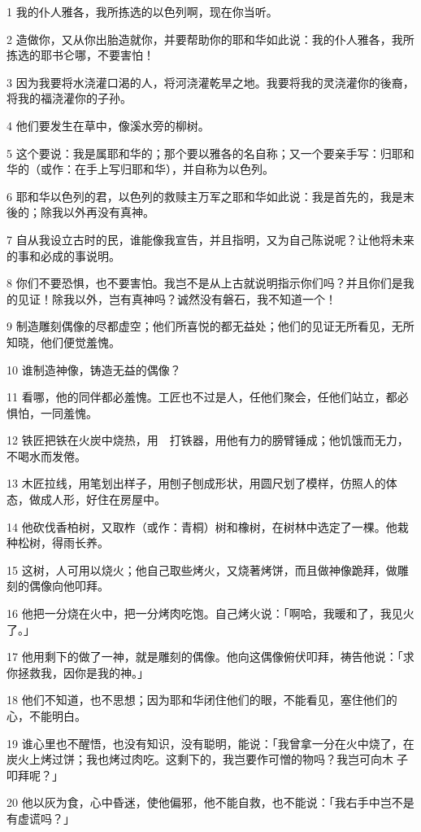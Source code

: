 \par 1 我的仆人雅各，我所拣选的以色列啊，现在你当听。
\par 2 造做你，又从你出胎造就你，并要帮助你的耶和华如此说：我的仆人雅各，我所拣选的耶书仑哪，不要害怕！
\par 3 因为我要将水浇灌口渴的人，将河浇灌乾旱之地。我要将我的灵浇灌你的後裔，将我的福浇灌你的子孙。
\par 4 他们要发生在草中，像溪水旁的柳树。
\par 5 这个要说：我是属耶和华的；那个要以雅各的名自称；又一个要亲手写：归耶和华的（或作：在手上写归耶和华），并自称为以色列。
\par 6 耶和华以色列的君，以色列的救赎主万军之耶和华如此说：我是首先的，我是末後的；除我以外再没有真神。
\par 7 自从我设立古时的民，谁能像我宣告，并且指明，又为自己陈说呢？让他将未来的事和必成的事说明。
\par 8 你们不要恐惧，也不要害怕。我岂不是从上古就说明指示你们吗？并且你们是我的见证！除我以外，岂有真神吗？诚然没有磐石，我不知道一个！
\par 9 制造雕刻偶像的尽都虚空；他们所喜悦的都无益处；他们的见证无所看见，无所知晓，他们便觉羞愧。
\par 10 谁制造神像，铸造无益的偶像？
\par 11 看哪，他的同伴都必羞愧。工匠也不过是人，任他们聚会，任他们站立，都必惧怕，一同羞愧。
\par 12 铁匠把铁在火炭中烧热，用　打铁器，用他有力的膀臂锤成；他饥饿而无力，不喝水而发倦。
\par 13 木匠拉线，用笔划出样子，用刨子刨成形状，用圆尺划了模样，仿照人的体态，做成人形，好住在房屋中。
\par 14 他砍伐香柏树，又取柞（或作：青桐）树和橡树，在树林中选定了一棵。他栽种松树，得雨长养。
\par 15 这树，人可用以烧火；他自己取些烤火，又烧著烤饼，而且做神像跪拜，做雕刻的偶像向他叩拜。
\par 16 他把一分烧在火中，把一分烤肉吃饱。自己烤火说：「啊哈，我暖和了，我见火了。」
\par 17 他用剩下的做了一神，就是雕刻的偶像。他向这偶像俯伏叩拜，祷告他说：「求你拯救我，因你是我的神。」
\par 18 他们不知道，也不思想；因为耶和华闭住他们的眼，不能看见，塞住他们的心，不能明白。
\par 19 谁心里也不醒悟，也没有知识，没有聪明，能说：「我曾拿一分在火中烧了，在炭火上烤过饼；我也烤过肉吃。这剩下的，我岂要作可憎的物吗？我岂可向木子叩拜呢？」
\par 20 他以灰为食，心中昏迷，使他偏邪，他不能自救，也不能说：「我右手中岂不是有虚谎吗？」
